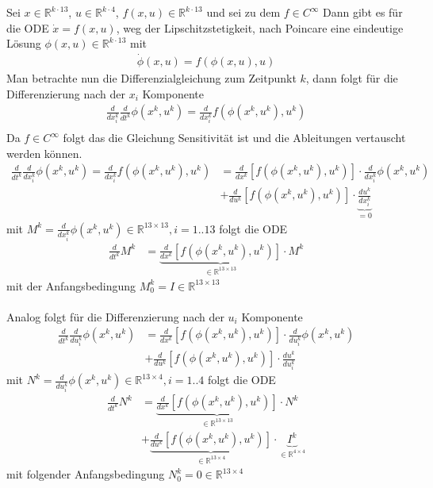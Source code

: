 \documentclass[12pt, a4paper]{scrartcl}
\begin{document}
Sei $x \in \mathbb{R}^{k \cdot 13}$, $u \in \mathbb{R}^{k \cdot 4}$, $f(x, u) \in \mathbb{R}^{k \cdot 13}$ und sei zu dem $f \in C^{\infty}$ Dann gibt es für die ODE $\dot x = f(x, u)$, weg der Lipschitzstetigkeit, nach Poincare eine eindeutige Lösung $\phi(x, u) \in \mathbb{R}^{k \cdot 13}$ mit 
\begin{align*}
 	\dot \phi(x, u) = f(\phi(x, u), u)
\end{align*}
Man betrachte nun die Differenzialgleichung zum Zeitpunkt $k$, dann folgt für die Differenzierung nach der $x_i$ Komponente
\begin{align*}
	\frac{d}{dx^k_i} \frac{d}{dt^k} \phi(x^k, u^k) = \frac{d}{dx^k_i} f(\phi(x^k, u^k), u^k) \\
\end{align*}
Da $f \in C^{\infty}$ folgt das die Gleichung Sensitivität ist und die Ableitungen vertauscht werden können.
\begin{align*}
\frac{d}{dt^k} \frac{d}{dx^k_i} \phi(x^k, u^k) = \frac{d}{dx^k_i} f(\phi(x^k, u^k), u^k)  &= \frac{d}{dx^k} \left[f(\phi(x^k, u^k), u^k) \right] \cdot \frac{d}{dx^k_i}\phi(x^k, u^k) \\
&+ \frac{d}{du^k}\left[ f(\phi(x^k, u^k), u^k)  \right] \cdot \underbrace{\frac{du^k}{dx^k_i}}_{=0}
\end{align*}
mit $M^k = \frac{d}{dx^k_i} \phi(x^k, u^k) \in \mathbb{R}^{13 \times 13}, i = 1..13$ folgt die ODE  
\begin{align*}
\frac{d}{dt^k} M^k &= \underbrace{\frac{d}{dx^k} \left[f(\phi(x^k, u^k), u^k) \right]}_{\in \mathbb{R}^{13 \times 13}} \cdot M^k
\end{align*}
mit der Anfangsbedingung $M_0^k = I \in \mathbb{R}^{13 \times 13} $ \\\\
Analog folgt für die Differenzierung nach der $u_i$ Komponente
\begin{align*}
\frac{d}{dt^k} \frac{d}{du^k_i} \phi(x^k, u^k) &= \frac{d}{dx^k} \left[f(\phi(x^k, u^k), u^k) \right] \cdot \frac{d}{du^k_i}\phi(x^k, u^k) \\
&+ \frac{d}{du^k}\left[ f(\phi(x^k, u^k), u^k)  \right] \cdot \frac{du^k}{du^k_i}
\end{align*}
mit $N^k = \frac{d}{du^k_i} \phi(x^k, u^k) \in \mathbb{R}^{13 \times 4}, i = 1..4$ folgt die ODE 
\begin{align*}
\frac{d}{dt^k} N^k &= \underbrace{\frac{d}{dx^k} \left[f(\phi(x^k, u^k), u^k) \right]}_{\in \mathbb{R}^{13 \times 13}} \cdot N^k \\
&+ \underbrace{
	\frac{d}{du^k}
		\left[ f(\phi(x^k, u^k), u^k)  \right]
		   }_
{\in \mathbb{R}^{13 \times 4}}
		   \cdot \underbrace{I^k}_{\in \mathbb{R}^{4 \times 4}}
\end{align*}
mit folgender Anfangsbedingung $N_0^k = 0 \in \mathbb{R}^{13 \times 4}$
\end{document}
